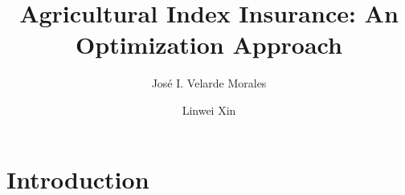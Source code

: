 \documentclass{beamer}
\title[Agricultural Index Insurance]{Agricultural Index Insurance: An Optimization Approach}
\author[José Velarde Morales]{José I. Velarde Morales \and Linwei Xin}
\institute[Chicago Booth]
{

  University of Chicago\\
  Booth School of Business

}
\begin{document}
\beamertemplatenavigationsymbolsempty
\frame{\titlepage}
\section{Introduction}

   


\end{document}
